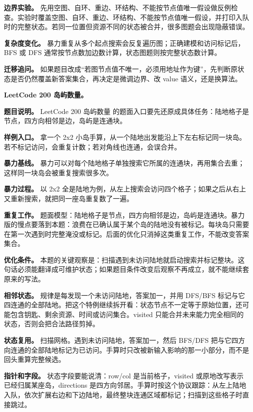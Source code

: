 \textbf{边界实验。} 先用空图、自环、重边、环结构、不能按节点值唯一假设做反例检查。实验时覆盖空图、自环、重边、环结构、不能按节点值唯一假设，并打印入队时的完整状态。若同一位置但资源不同的状态被合并，很多图题会出现隐蔽错误。

\textbf{复杂度变化。} 暴力重复从多个起点搜索会反复遍历图；正确建模和访问标记后，BFS 或 DFS 通常按节点数加边数计算，状态图题则按完整状态数计算。

\textbf{迁移追问。} 如果题目改成“若图节点值不唯一，必须用地址作为键”，先判断原状态是否仍然覆盖新答案集合，再决定是微调边界、改 value 语义，还是换算法。

\noindent\textbf{LeetCode 200 岛屿数量。}

\textbf{题目说明。} LeetCode 200 岛屿数量 的题面入口要先还原成具体任务：陆地格子是节点，四方向相邻是边，岛屿是连通块。

\textbf{样例入口。} 拿一个 2x2 小岛手算，从一个陆地出发能沿上下左右标记同一块岛。若不标记访问，会重复计数；若对角线也连通，会误合并。

\textbf{暴力基线。} 暴力可以对每个陆地格子单独搜索它所属的连通块，再用集合去重；这样同一块岛会被重复搜索很多次。

\textbf{暴力过程。} 以 2x2 全是陆地为例，从左上搜索会访问四个格子；如果之后从右上又重新搜索，就把同一座岛重复数了一遍。

\textbf{重复工作。} 题面模型：陆地格子是节点，四方向相邻是边，岛屿是连通块。暴力版的慢点要落到本题：浪费在已确认属于某个岛的陆地没有被标记。每块岛只需要在第一次遇到时完整淹没或标记。后面的优化只消掉这类重复工作，不能改变答案集合。

\textbf{优化条件。} 本题的关键观察是：扫描遇到未访问陆地就启动搜索并标记整块。这句话必须能翻译成可维护状态；如果题目条件改变后观察不再成立，就不能继续套原来的写法。

\textbf{相邻状态。} 规律是每发现一个未访问陆地，答案加一，并用 DFS/BFS 标记与它四连通的全部陆地。把这个特例继续拆开看：状态节点不一定等于原始位置，还可能包含钥匙、剩余资源、时间或访问集合。visited 只能合并未来能力完全相同的状态，否则会把合法路径剪掉。

\textbf{状态复用。} 扫描网格。遇到未访问陆地，答案加一，然后 BFS/DFS 把与它四方向连通的全部陆地标记为已访问。手算时只改被新输入影响的那一小部分，而不是回头重算完整候选。

\textbf{指针和字段。} 状态字段要能说清：row/col 是当前格子，visited 或原地改写表示已经归属某座岛，directions 是四方向邻居。手算时按这个协议跟踪：从左上陆地入队，依次扩展右边和下边陆地，最终整块连通区域都标记；扫描到这些格子时直接跳过。

